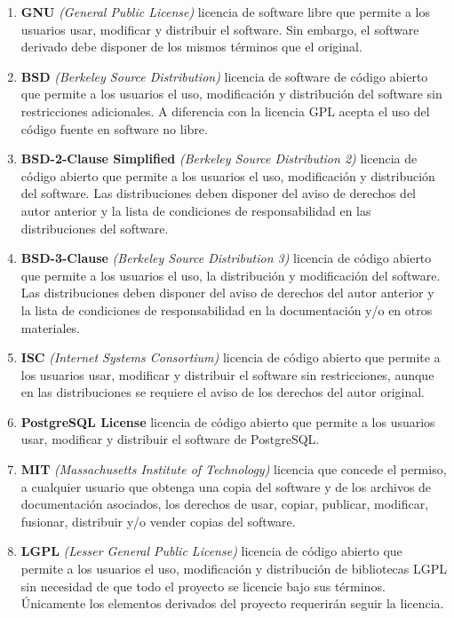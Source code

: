 \begin{enumerate}
    \item\textbf{GNU} \textit{(General Public License)} \cite{gnu} licencia de software libre que permite a los usuarios usar, modificar y distribuir el software. Sin embargo, el software derivado debe disponer de los mismos términos que el original.
    
    \item \textbf{BSD} \textit{(Berkeley Source Distribution)} \cite{bsd} licencia de software de código abierto que permite a los usuarios el uso, modificación y distribución del software sin restricciones adicionales. A diferencia con la licencia GPL acepta el uso del código fuente en software no libre.
    
    
    \item \textbf{BSD-2-Clause Simplified} \textit{(Berkeley Source Distribution 2)} \cite{bsd-2} licencia de código abierto que permite a los usuarios el uso, modificación y distribución del software. Las distribuciones deben disponer del aviso de derechos del autor anterior y la lista de condiciones de responsabilidad en las distribuciones del software.
    
    \item \textbf{BSD-3-Clause} \textit{(Berkeley Source Distribution 3)} \cite{bsd-3}
licencia de código abierto que permite a los usuarios el uso, la distribución y modificación del software. Las distribuciones deben disponer del aviso de derechos del autor anterior y la lista de condiciones de responsabilidad en la documentación y/o en otros materiales.

    \item \textbf{ISC} \textit{(Internet Systems Consortium)} licencia de código abierto que permite a los usuarios usar, modificar y distribuir el software sin restricciones, aunque en las distribuciones se requiere el aviso de los derechos del autor original.
     
    \item \textbf{PostgreSQL License} \cite{postgresql-license} licencia de código abierto que permite a los usuarios usar, modificar y distribuir el software de PostgreSQL.
    
    \item \textbf{MIT} \textit{(Massachusetts Institute of Technology)}  \cite{mit} licencia que concede el permiso, a cualquier usuario que obtenga una copia del software y de los archivos de documentación asociados, los derechos de usar, copiar, publicar, modificar, fusionar, distribuir y/o vender copias del software.
    
    \item \textbf{LGPL} \textit{(Lesser General Public License)} \cite{lgpl} licencia de código abierto que permite a los usuarios el uso, modificación y distribución de bibliotecas LGPL sin necesidad de que todo el proyecto se licencie bajo sus términos. Únicamente los elementos derivados del proyecto requerirán seguir la licencia.
    
\end{enumerate}